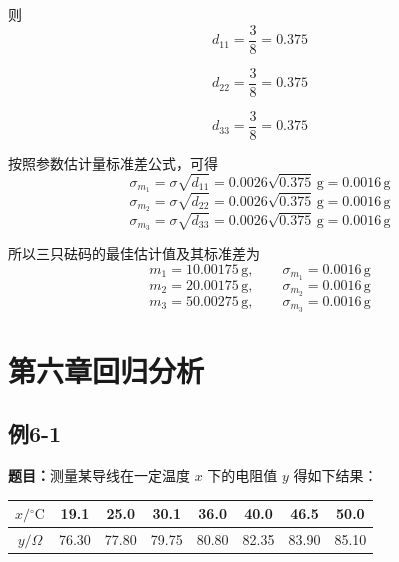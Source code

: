 \documentclass[UTF8,zihao=-4]{ctexart}
\newcommand{\problem}[1]{\subsection*{#1}}
\newcommand{\timu}{\noindent\textbf{题目：}}
\begin{document}
则
\begin{equation*}
    d_{11}=\frac{3}{8}=0.375
\end{equation*}

\begin{equation*}
    d_{22}=\frac{3}{8}=0.375
\end{equation*}

\begin{equation*}
    d_{33}=\frac{3}{8}=0.375
\end{equation*}

按照参数估计量标准差公式，可得
\begin{equation*}
    \sigma_{m_1}
    =
    \sigma\sqrt{d_{11}}
    =
    0.0026\sqrt{0.375}\,\mathrm{g}
    =
    0.0016\,\mathrm{g}
\end{equation*}
\begin{equation*}
    \sigma_{m_2}
    =
    \sigma\sqrt{d_{22}}
    =
    0.0026\sqrt{0.375}\,\mathrm{g}
    =
    0.0016\,\mathrm{g}
\end{equation*}
\begin{equation*}
    \sigma_{m_3}
    =
    \sigma\sqrt{d_{33}}
    =
    0.0026\sqrt{0.375}\,\mathrm{g}
    =
    0.0016\,\mathrm{g}
\end{equation*}

所以三只砝码的最佳估计值及其标准差为
\begin{equation*}
    m_1=10.00175\,\mathrm{g},
    \qquad
    \sigma_{m_1}=0.0016\,\mathrm{g}
\end{equation*}
\begin{equation*}
    m_2=20.00175\,\mathrm{g},
    \qquad
    \sigma_{m_2}=0.0016\,\mathrm{g}
\end{equation*}
\begin{equation*}
    m_3=50.00275\,\mathrm{g},
    \qquad
    \sigma_{m_3}=0.0016\,\mathrm{g}
\end{equation*}


\section*{第六章\quad 回归分析}

\problem{例6-1}

\timu 测量某导线在一定温度 $x$ 下的电阻值 $y$ 得如下结果：

\begin{center}
\small
\setlength{\tabcolsep}{5pt}
\begin{tabular}{c|ccccccc}
\toprule
$x/{}^\circ\mathrm{C}$ & 19.1 & 25.0 & 30.1 & 36.0 & 40.0 & 46.5 & 50.0\\
\midrule
$y/\Omega$ & 76.30 & 77.80 & 79.75 & 80.80 & 82.35 & 83.90 & 85.10\\
\bottomrule
\end{tabular}
\end{center}
\end{document}
